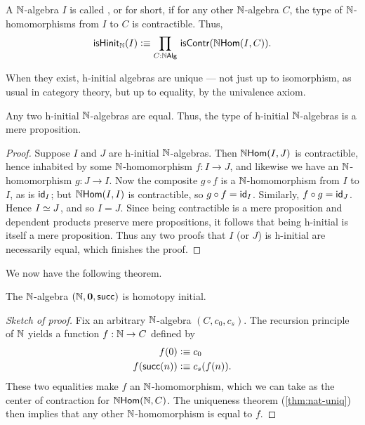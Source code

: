 \begin{defn}
  A $\nat$-algebra $I$ is called ,
  or 
  for short, if for any other $\nat$-algebra $C$, the type of $\nat$-homomorphisms from $I$ to $C$ is contractible. Thus,
\begin{equation*}
\ishinitn(I) \defeq \prd{C : \nalg} \iscontr(\nhom(I,C)).
\end{equation*}
\end{defn}

When they exist, h-initial algebras are unique --- not just up to isomorphism, as usual in category theory, but up to equality, by the univalence axiom.

\begin{thm}
  Any two h-initial $\nat$-algebras are equal.
  Thus, the type of h-initial $\nat$-algebras is a mere proposition.
\end{thm}
\begin{proof}
  Suppose $I$ and $J$ are h-initial $\nat$-algebras.
  Then $\nhom(I,J)$ is contractible, hence inhabited by some $\nat$-homomorphism $f:I\to J$, and likewise we have an $\nat$-homomorphism $g:J\to I$.
  Now the composite $g\circ f$ is a $\nat$-homomorphism from $I$ to $I$, as is $\idfunc[I]$; but $\nhom(I,I)$ is contractible, so $g\circ f = \idfunc[I]$.
  Similarly, $f\circ g = \idfunc[J]$.
  Hence $\eqv IJ$, and so $I=J$. Since being contractible is a mere proposition and dependent products preserve mere propositions, it follows that being h-initial is itself a mere proposition. Thus any two proofs that $I$ (or $J$) is h-initial are necessarily equal, which finishes the proof. 
\end{proof}

We now have the following theorem.

\begin{thm}\label{thm:nat-hinitial}
The $\nat$-algebra $(\nat, \emptyt, \suc)$ is homotopy initial.
\end{thm}
\begin{proof}[Sketch of proof]
  Fix an arbitrary $\nat$-algebra $(C,c_0,c_s)$.
  The recursion principle of $\nat$ yields a function $f:\nat\to C$ defined by
  \begin{align*}
    f(0) &\defeq c_0\\
    f(\suc(n)) &\defeq c_s(f(n)).
  \end{align*}
  These two equalities make $f$ an $\nat$-homomorphism, which we can take as the center of contraction for $\nhom(\nat,C)$.
  The uniqueness theorem (\autoref{thm:nat-uniq}) then implies that any other $\nat$-homomorphism is equal to $f$.
\end{proof}

